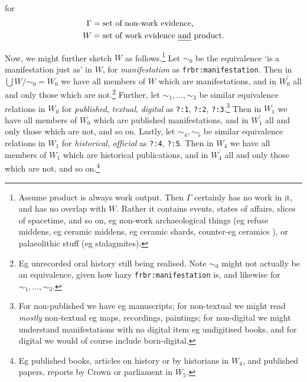 \documentclass{amsart}%
\newcommand{\code}[1]{\texttt{#1}}%
\newcommand{\mention}[1]{\textit{#1}}%
\newcommand{\simset}{\mathord\sim}%
\theoremstyle{plain}
\theoremstyle{definition}
\theoremstyle{remark}
\theoremstyle{definition}
\theoremstyle{remark}
\begin{document}
for
\begin{align*}
\Gamma &= \text{set of non-work evidence,}\\
W &= \text{set of work evidence \emph{and} product.}
\end{align*}

Now, we might further sketch \(W\) as follows.\footnote{Assume product is always work output. Then \(\Gamma\) certainly has no work in it, and has no overlap with \(W\). Rather it contains events, states of affairs, slices of spacetime, and so on, eg non-work archaeological things (eg refuse middens, eg ceramic middens, eg ceramic shards, counter-eg ceramics%
), or palaeolithic stuff (eg stalagmites).} Let \(\sim_0\) be the equivalence `is a manifestation just as' in \(W\), for \mention{manifestation} as \code{frbr:manifestation}. Then in \(\bigcup W\slash\simset_0=W_0\) we have all members of \(W\) which are manifestations, and in \(W_0^\prime\) all and only those which are not.\footnote{Eg unrecorded oral history still being realised. Note \(\sim_0\) might not actually be an equivalence, given how hazy \code{frbr:manifestation} is, and likewise for \(\sim_1,\ldots,\sim_3\).} Further, let \(\sim_1,\ldots,\sim_3\) be similar equivalence relations in \(W_0\) for \mention{published}, \mention{textual}, \mention{digital} as \code{?:1}, \code{?:2}, \code{?:3}.\footnote{For non-published we have eg manuscripts; for non-textual we might read \emph{mostly} non-textual eg maps, recordings, paintings; for non-digital we might understand manifestations with no digital item eg undigitised books, and for digital we would of course include born-digital.} Then in \(W_1\) we have all members of \(W_0\) which are published manifestations, and in \(W_1^\prime\) all and only those which are not, and so on. Lastly, let \(\sim_4,\sim_5\) be similar equivalence relations in \(W_1\) for \mention{historical}, \mention{official} as \code{?:4}, \code{?:5}. %
Then in \(W_4\) we have all members of \(W_1\) which are historical publications, and in \(W_4^\prime\) all and only those which are not, and so on.\footnote{Eg published books, articles on history or by historians in \(W_4\), and published papers, reports by Crown or parliament in \(W_5\).}
\end{document}

